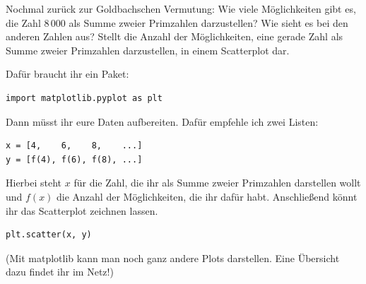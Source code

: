 \documentclass[a4paper, 12pt]{cssheet}
\begin{document}
	\newpage
	\begin{aufgabe}
		Nochmal zurück zur Goldbachschen Vermutung: Wie viele Möglichkeiten gibt es, die Zahl $8\,000$ als Summe zweier Primzahlen darzustellen? Wie sieht es bei den anderen Zahlen aus? Stellt die Anzahl der Möglichkeiten, eine gerade Zahl als Summe zweier Primzahlen darzustellen, in einem Scatterplot dar.
		
		Dafür braucht ihr ein Paket:
		\begin{verbatim}
import matplotlib.pyplot as plt
		\end{verbatim}
		
		Dann müsst ihr eure Daten aufbereiten. Dafür empfehle ich zwei Listen:
		
		\begin{verbatim}
x = [4,    6,    8,    ...]
y = [f(4), f(6), f(8), ...]
		\end{verbatim}
		
		Hierbei steht $x$ für die Zahl, die ihr als Summe zweier Primzahlen darstellen wollt und $f(x)$ die Anzahl der Möglichkeiten, die ihr dafür habt. Anschließend könnt ihr das Scatterplot zeichnen lassen.
		
		\begin{verbatim}
plt.scatter(x, y)
		\end{verbatim}
		
		(Mit matplotlib kann man noch ganz andere Plots darstellen. Eine Übersicht dazu findet ihr im Netz!)
	\end{aufgabe}
		
	\printlicense
	
	\printsocials
	
\end{document}
